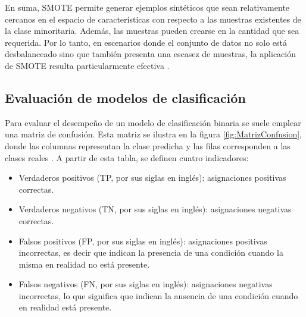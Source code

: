 En suma, SMOTE permite generar ejemplos sintéticos que sean relativamente cercanos en el espacio de 
características con respecto a las muestras existentes de la clase minoritaria. Además, las muestras 
pueden crearse en la cantidad que sea requerida. Por lo tanto, en escenarios donde el conjunto de 
datos no solo está desbalanceado sino que también presenta una escasez de muestras, la aplicación 
de SMOTE resulta particularmente efectiva \citep{CITE:37} \citep{CITE:38}.


\subsection{Evaluación de modelos de clasificación}


Para evaluar el desempeño de un modelo de clasificación binaria se suele emplear una matriz de confusión. 
Esta matriz se ilustra en la figura \ref{fig:MatrizConfusion}, donde las columnas representan la clase 
predicha y las filas corresponden a las clases reales \citep{CITE:44}. 
A partir de esta tabla, se definen cuatro indicadores:

\begin{itemize}
	\item Verdaderos positivos (TP, por sus siglas en inglés): asignaciones positivas correctas.
	\item Verdaderos negativos (TN, por sus siglas en inglés): asignaciones negativas correctas.
\item Falsos positivos (FP, por sus siglas en inglés): asignaciones positivas incorrectas, es decir que
indican la presencia de una condición cuando la misma en realidad no está presente.
\item Falsos negativos (FN, por sus siglas en inglés): asignaciones negativas incorrectas, lo que significa
que indican la ausencia de una condición cuando en realidad está presente.
\end{itemize}

